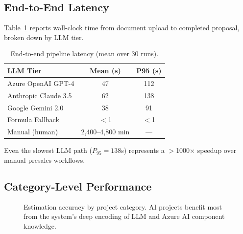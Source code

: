 \documentclass[10pt,twocolumn]{article}
\begin{document}
\subsection{End-to-End Latency}

Table~\ref{tab:latency} reports wall-clock time from document upload to
completed proposal, broken down by LLM tier.

\begin{table}[H]
\centering
\small
\caption{End-to-end pipeline latency (mean over 30 runs).}
\label{tab:latency}
\begin{tabular}{lcc}
\toprule
\textbf{LLM Tier} & \textbf{Mean (s)} & \textbf{P95 (s)} \\
\midrule
Azure OpenAI GPT-4   & 47 & 112 \\
Anthropic Claude 3.5  & 62 & 138 \\
Google Gemini 2.0     & 38 & 91  \\
\rowcolor{BoxPurple}
Formula Fallback      & $<$1 & $<$1 \\
\midrule
Manual (human)        & 2,400--4,800 min & — \\
\bottomrule
\end{tabular}
\end{table}

Even the slowest LLM path ($P_{95} = 138$s) represents a $>$1000$\times$
speedup over manual presales workflows.

\subsection{Category-Level Performance}

\begin{figure}[H]
\centering
{}
\caption{Estimation accuracy by project category. AI projects benefit most
from the system's deep encoding of LLM and Azure AI component knowledge.}
\label{fig:accuracy}
\end{figure}
\end{document}
